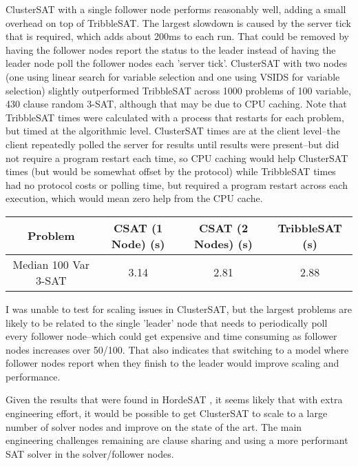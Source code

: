 \documentclass[10pt]{article}
\begin{document}
  ClusterSAT with a single follower node performs reasonably well, adding a small overhead on top of TribbleSAT.  The largest slowdown is caused by the server tick that is required, which adds about 200ms to 
  each run.   That could be removed by having the follower nodes report the status to the leader instead of having the leader node poll the follower nodes each 'server tick'.  ClusterSAT with two nodes (one using linear search for variable selection and one using VSIDS for variable selection) slightly outperformed TribbleSAT across 1000 problems of 100 variable, 430 clause random 3-SAT, although that may be due to CPU caching.  Note that TribbleSAT times were calculated with a process that restarts for each problem, but timed at the algorithmic level.  ClusterSAT times are at the client level--the client repeatedly polled the server for results until results were present--but did not require a program restart each time, so CPU caching would help ClusterSAT times (but would be somewhat offset by the protocol) while TribbleSAT times had no protocol costs or polling time, but required a program restart across each execution, which would mean zero help from the CPU cache.
  
  \begin{center}
 \begin{tabular}{||c c c c||} 
 \hline
 Problem & CSAT (1 Node) (s) & CSAT (2 Nodes) (s) & TribbleSAT (s) \\ [0.5ex] 
 \hline\hline
Median 100 Var 3-SAT & 3.14 & 2.81 & 2.88 \\ 
 \hline
\end{tabular}
\end{center}
  
  I was unable to test for scaling issues in ClusterSAT, but the largest problems are likely to be related to the single 'leader' node that needs to periodically poll every follower node--which could get expensive and time consuming as follower nodes increases over 50/100.  That also indicates that switching to a model where follower nodes report when they finish to the leader would improve scaling and performance.
  
  Given the results that were found in HordeSAT \cite{hordesat}, it seems likely that with extra engineering effort, it would be possible to get ClusterSAT to scale to a large number of solver nodes and improve on the state of the art.  The main engineering challenges remaining are clause sharing and using a more performant SAT solver in the solver/follower nodes.
  
\end{document}
